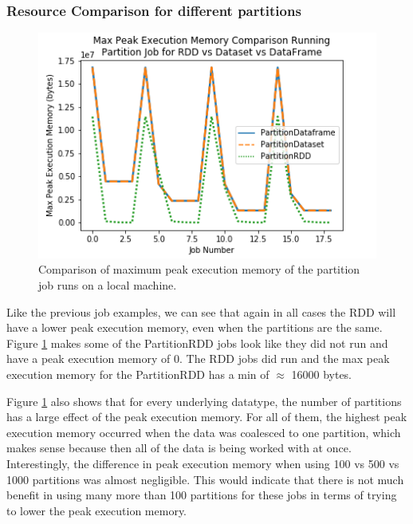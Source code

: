 \documentclass[conference]{IEEEtran}
\begin{document}
\subsubsection{Resource Comparison for different partitions}
\begin{figure}
    \includegraphics[width=\linewidth]{../python_scripts/images/partitionJobMaxPeakExecutionMemory.png}
    \caption{Comparison of maximum peak execution memory of the partition job runs on a local machine.}
    \label{fig:partitionJobMaxPeakExecutionMemory}
\end{figure}

Like the previous job examples, we can see that again in all cases the RDD will have a lower peak execution memory, even when the partitions are the same.
Figure \ref{fig:partitionJobMaxPeakExecutionMemory} makes some of the PartitionRDD jobs look like they did not run and have a peak execution memory of 0.
The RDD jobs did run and the max peak execution memory for the PartitionRDD has a min of $\approx$ 16000 bytes.

Figure \ref{fig:partitionJobMaxPeakExecutionMemory} also shows that for every underlying datatype, the number of partitions has a large effect of the peak execution memory.
For all of them, the highest peak execution memory occurred when the data was coalesced to one partition, which makes sense because then all of the data is being worked with at once.
Interestingly, the difference in peak execution memory when using 100 vs 500 vs 1000 partitions was almost negligible.
This would indicate that there is not much benefit in using many more than 100 partitions for these jobs in terms of trying to lower the peak execution memory.
\end{document}
